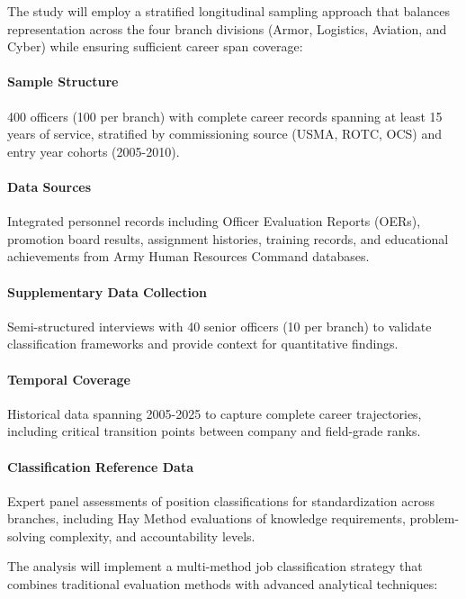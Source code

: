 \documentclass[../main.tex]{subfiles}
\begin{document}
The study will employ a stratified longitudinal sampling approach that balances representation across the four branch divisions (Armor, Logistics, Aviation, and Cyber) while ensuring sufficient career span coverage:

\paragraph{Sample Structure} 400 officers (100 per branch) with complete career records spanning at least 15 years of service, stratified by commissioning source (USMA, ROTC, OCS) and entry year cohorts (2005-2010).

\paragraph{Data Sources} Integrated personnel records including Officer Evaluation Reports (OERs), promotion board results, assignment histories, training records, and educational achievements from Army Human Resources Command databases.

\paragraph{Supplementary Data Collection} Semi-structured interviews with 40 senior officers (10 per branch) to validate classification frameworks and provide context for quantitative findings.

\paragraph{Temporal Coverage} Historical data spanning 2005-2025 to capture complete career trajectories, including critical transition points between company and field-grade ranks.

\paragraph{Classification Reference Data} Expert panel assessments of position classifications for standardization across branches, including Hay Method evaluations of knowledge requirements, problem-solving complexity, and accountability levels.

The analysis will implement a multi-method job classification strategy that combines traditional evaluation methods with advanced analytical techniques:
\end{document}
